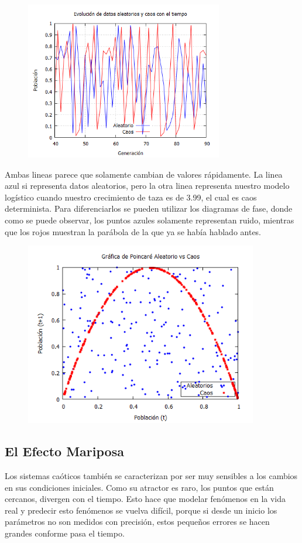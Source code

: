 \documentclass[12pt]{article}
\begin{document}
\begin{figure}[h!]
    \centering
\includegraphics[width=3.4in]{cva.png}
\end{figure}

Ambas lineas parece que solamente cambian de valores rápidamente. La linea azul si representa datos aleatorios, pero la otra linea representa nuestro modelo logístico cuando nuestro crecimiento de taza es de 3.99, el cual es caos determinista. Para diferenciarlos se pueden utilizar los diagramas de fase, donde como se puede observar, los puntos azules solamente representan ruido, mientras que los rojos muestran la parábola de la que ya se había hablado antes. 

\begin{figure}[h!]
    \centering
\includegraphics[width=4in]{Poi5.png}
\end{figure}

\subsection{El Efecto Mariposa}
Los sistemas caóticos también se caracterizan por ser muy sensibles a los cambios en sus condiciones iniciales. Como su atractor es raro, los puntos que están cercanos, divergen con el tiempo. Esto hace que modelar fenómenos en la vida real y predecir esto fenómenos se vuelva difícil, porque si desde un inicio los parámetros no son medidos con precisión, estos pequeños errores se hacen grandes conforme pasa el tiempo. \\
\end{document}
